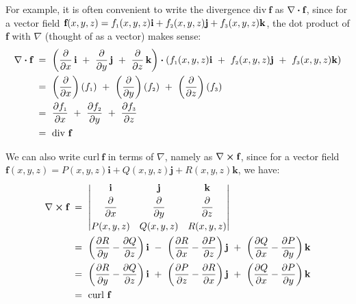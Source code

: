 For example, it is often convenient to write the divergence $\text{div}~\textbf{f}$ as $\nabla \bm{\cdot} \textbf{f}$,
since for a vector field $\textbf{f}(x,y,z) =
f_{\scriptscriptstyle 1}(x,y,z)\textbf{i} + f_{\scriptscriptstyle 2}(x,y,z) \textbf{j} + f_{\scriptscriptstyle 3}(x,y,z) \textbf{k}$, the dot product of
\textbf{f} with $\nabla$ (thought of as a vector) makes sense:
\begin{align*}
 \nabla \bm{\cdot} \textbf{f} ~&=~ \left( \frac{\partial}{\partial x}\,\textbf{i} ~+~
  \frac{\partial}{\partial y}\,\textbf{j} ~+~ \frac{\partial}{\partial z}\,\textbf{k} \right)  \bm{\cdot} \left( f_{\scriptscriptstyle 1}(x,y,z)
  \textbf{i} ~+~ f_{\scriptscriptstyle 2}(x,y,z) \textbf{j} ~+~ f_{\scriptscriptstyle 3}(x,y,z) \textbf{k} \right)\\
   &=~ \left( \frac{\partial}{\partial x} \right) (f_{\scriptscriptstyle 1}) ~+~
    \left( \frac{\partial}{\partial y} \right) (f_{\scriptscriptstyle 2}) ~+~
    \left( \frac{\partial}{\partial z} \right) (f_{\scriptscriptstyle 3})\\
   &=~ \frac{\partial f_{\scriptscriptstyle 1}}{\partial x} ~+~ \frac{\partial f_{\scriptscriptstyle 2}}{\partial y} ~+~
  \frac{\partial f_{\scriptscriptstyle 3}}{\partial z}\\
   &=~ \text{div}~\textbf{f}
\end{align*}

We can also write $\text{curl}~\textbf{f}$ in terms of $\nabla$, namely as $\nabla \bm{\times} \textbf{f}$, since
for a vector field $\textbf{f}(x,y,z) = P(x,y,z)\textbf{i} + Q(x,y,z)\textbf{j} + R(x,y,z)\textbf{k}$, we have:
\begin{align*}
 \Crossprod{\nabla}{\textbf{f}} ~&=~
 \begin{vmatrix}
  \textbf{i} & \textbf{j} & \textbf{k} \vspace{1mm}\\ \dfrac{\partial}{\partial x} & \dfrac{\partial}{\partial y} &
   \dfrac{\partial}{\partial z} \vspace{1mm}\\
  P(x,y,z) & Q(x,y,z) & R(x,y,z)
 \end{vmatrix}\\
 &=~ \left( \frac{\partial R}{\partial y} - \frac{\partial Q}{\partial z} \right) \textbf{i} ~-~
    \left( \frac{\partial R}{\partial x} - \frac{\partial P}{\partial z} \right) \textbf{j} ~+~
    \left( \frac{\partial Q}{\partial x} - \frac{\partial P}{\partial y} \right) \textbf{k}\\
 &=~ \left( \frac{\partial R}{\partial y} - \frac{\partial Q}{\partial z} \right) \textbf{i} ~+~
    \left( \frac{\partial P}{\partial z} - \frac{\partial R}{\partial x} \right) \textbf{j} ~+~
    \left( \frac{\partial Q}{\partial x} - \frac{\partial P}{\partial y} \right) \textbf{k}\\
 &=~ \text{curl}~\textbf{f}
\end{align*}

